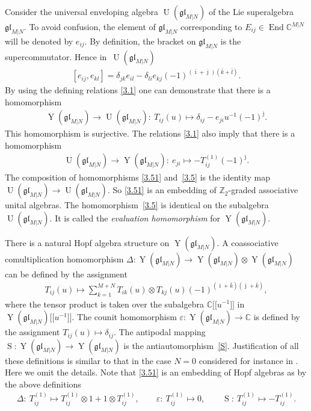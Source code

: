 \documentclass[pdftex]{sigma}
\numberwithin{equation}{section}
\def\1{^{-1}}
\def\bi{{\bar\imath }}
\def\bj{{\bar\jmath }}
\def\bk{{\bar k }}
\def\bl{{\bar l }}
\def\CC{{\mathbb{C}}}
\def\CMN{\CC^{M|N}}
\def\de{\delta}
\def\De{\Delta}
\def\End{\operatorname{End}}
\def\ep{\varepsilon}
\def\glMN{\mathfrak{gl}_{M|N}}
\def\ot{\otimes}
\def\S{\operatorname{S}}
\def\UMN{\operatorname{U}(\glMN)}
\def\YMN{\operatorname{Y}(\glMN)}
\def\ZZ{\mathbb{Z}}
\begin{document}
Consider the universal enveloping
algebra $\UMN$ of the Lie superalgebra $\glMN $.
To avoid confusion, the element of $\glMN$
corresponding to $E_{ij}\in\End\CMN$ will be denoted by $e_{ij} $.
By definition, the bracket on $\glMN$ is the supercommutator.
Hence in~$\UMN$
\begin{gather}\label{glMN}
[ e_{ij} ,e_{kl} ]=
\de_{jk} e_{il}-
\de_{li} e_{kj}
{(-1)}^{( \bi+ \bj )( \bk+ \bl )} .
\end{gather}
By using the defining relations \eqref{3.1} one can demonstrate that
there is a homomorphism
\begin{gather}\label{3.5}
\YMN\to\UMN\colon \ T_{ij}(u)\mapsto \de_{ij}-e_{ji} u^{-1} {(-1)}^{\bj} .
\end{gather}
This homomorphism is surjective. The relations \eqref{3.1} also imply that there is a homomorphism
\begin{gather}\label{3.51}
\UMN\to\YMN\colon \
e_{ji}\mapsto- T_{ij}^{(1)} {(-1)}^{\bj} .
\end{gather}
The composition of homomorphisms \eqref{3.51}
and~\eqref{3.5}
is the identity map $\UMN\to\UMN $. So
\eqref{3.51} is an embedding of $\ZZ_2$-graded associative unital algebras.
The homomorphism~\eqref{3.5} is identical on the subalgebra~$\UMN $.
It is called
the {\it evaluation homomorphism} for $\YMN $.

There is a natural Hopf algebra structure on $\YMN $.
A coassociative comultiplication homomorphism $\De\colon \YMN\to\YMN\ot\YMN$
can be defined by the assignment
\begin{gather}\label{3.7}
T_{ij}(u)\mapsto\sum_{k=1}^{M+N}
T_{ik}(u)\ot T_{kj}(u)
{(-1)}^{( \bi + \bk )( \bj + \bk )},
\end{gather}
where the tensor product is taken over the subalgebra $\CC\big[\big[u^{-1}\big]\big]$
in $\YMN \big[\big[u\1\big]\big] $.
The counit homomorphism $\ep\colon \YMN\to\CC$ is defined
by the assignment $T_{ij}(u)\mapsto\de_{ij} $.
The antipodal mapping $\S\colon \YMN\to\YMN$ is the antiautomorphism~\eqref{S}.
Justification of all these
definitions is similar to that in the case $N=0$
considered for instance in \cite[Section~1]{MNO}. Here we omit the details.
Note that \eqref{3.51} is an embedding of Hopf algebras as
by the above definitions
\begin{gather*}
\De\colon \ T_{ij}^{(1)}\mapsto T_{ij}^{(1)}\ot1+1\ot T_{ij}^{(1)} ,
\qquad
\ep\colon \ T_{ij}^{(1)}\mapsto0 ,
\qquad
\S\colon \ T_{ij}^{(1)}\mapsto- T_{ij}^{(1)} .
\end{gather*}
\end{document}
